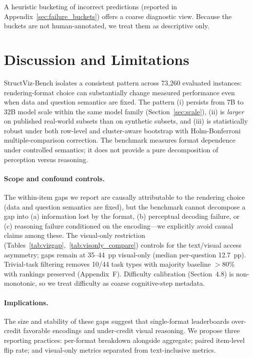 \documentclass{article}
\begin{document}
A heuristic bucketing of incorrect predictions (reported in Appendix~\ref{sec:failure_buckets}) offers a coarse diagnostic view. Because the buckets are not human-annotated, we treat them as descriptive only.

\section{Discussion and Limitations}
StructViz-Bench isolates a consistent pattern across 73{,}260 evaluated instances: rendering-format choice can substantially change measured performance even when data and question semantics are fixed. The pattern (i) persists from 7B to 32B model scale within the same model family (Section~\ref{sec:scale}), (ii) is \emph{larger} on published real-world subsets than on synthetic subsets, and (iii) is statistically robust under both row-level and cluster-aware bootstrap with Holm-Bonferroni multiple-comparison correction. The benchmark measures format dependence under controlled semantics; it does not provide a pure decomposition of perception versus reasoning.

\paragraph{Scope and confound controls.} The within-item gaps we report are causally attributable to the rendering choice (data and question semantics are fixed), but the benchmark cannot decompose a gap into (a) information lost by the format, (b) perceptual decoding failure, or (c) reasoning failure conditioned on the encoding---we explicitly avoid causal claims among these. The visual-only restriction (Tables~\ref{tab:vizgap},~\ref{tab:visonly_compare}) controls for the text/visual access asymmetry; gaps remain at 35--44~pp visual-only (median per-question 12.7~pp). Trivial-task filtering removes 10/44 task types with majority baseline $>$80\% with rankings preserved (Appendix~F). Difficulty calibration (Section~4.8) is non-monotonic, so we treat difficulty as coarse cognitive-step metadata.

\paragraph{Implications.} The size and stability of these gaps suggest that single-format leaderboards over-credit favorable encodings and under-credit visual reasoning. We propose three reporting practices: per-format breakdown alongside aggregate; paired item-level flip rate; and visual-only metrics separated from text-inclusive metrics.
\end{document}
